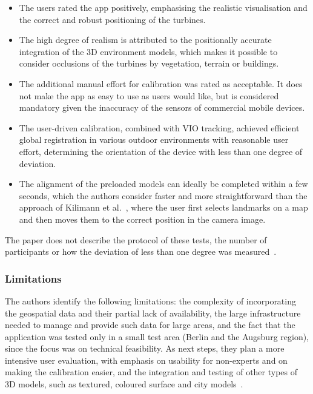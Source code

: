 \begin{itemize}
    \item The users rated the app positively, emphasising the realistic visualisation and the correct and robust positioning of the turbines.
    \item The high degree of realism is attributed to the positionally accurate integration of the 3D environment models, which makes it possible to consider occlusions of the turbines by vegetation, terrain or buildings.
    \item The additional manual effort for calibration was rated as acceptable. It does not make the app as easy to use as users would like, but is considered mandatory given the inaccuracy of the sensors of commercial mobile devices.
    \item The user-driven calibration, combined with VIO tracking, achieved efficient global registration in various outdoor environments with reasonable user effort, determining the orientation of the device with less than one degree of deviation.
    \item The alignment of the preloaded models can ideally be completed within a few seconds, which the authors consider faster and more straightforward than the approach of Kilimann et al.~\cite{kilimann2019ar}, where the user first selects landmarks on a map and then moves them to the correct position in the camera image.
\end{itemize}

The paper does not describe the protocol of these tests, the number of participants or how the deviation of less than one degree was measured~\cite{burkard2022gistam}.

\subsubsection{Limitations}

The authors identify the following limitations: the complexity of incorporating the geospatial data and their partial lack of availability, the large infrastructure needed to manage and provide such data for large areas, and the fact that the application was tested only in a small test area (Berlin and the Augsburg region), since the focus was on technical feasibility. As next steps, they plan a more intensive user evaluation, with emphasis on usability for non-experts and on making the calibration easier, and the integration and testing of other types of 3D models, such as textured, coloured surface and city models~\cite{burkard2022gistam}.

